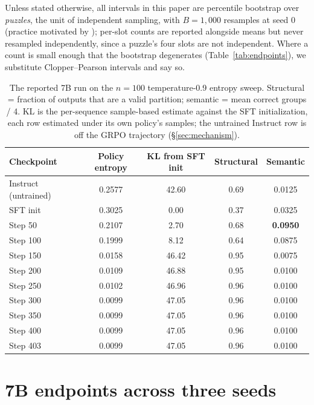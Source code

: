\documentclass{article}
\begin{document}
Unless stated otherwise, all intervals in this paper are percentile bootstrap over \emph{puzzles}, the unit of independent sampling, with $B=1{,}000$ resamples at seed 0 (practice motivated by \citealp{agarwal2021}); per-slot counts are reported alongside
means but never resampled independently, since a puzzle's four slots are
not independent. Where a count is small enough that the bootstrap
degenerates (Table~\ref{tab:endpoints}), we substitute Clopper--Pearson
intervals and say so.

\begin{table}[h]
\centering
\caption{The reported 7B run on the $n=100$ temperature-0.9 entropy sweep.
Structural = fraction of outputs that are a valid partition; semantic = mean
correct groups / 4. KL is the per-sequence sample-based estimate against the
SFT initialization, each row estimated under its own policy's samples; the
untrained Instruct row is off the GRPO trajectory
(\S\ref{sec:mechanism}).}
\label{tab:ckpt}
\begin{tabular}{lcccc}
\toprule
Checkpoint & Policy entropy & KL from SFT init & Structural & Semantic \\
\midrule
Instruct (untrained) & 0.2577 & 42.60 & 0.69 & 0.0125 \\
\midrule
SFT init  & 0.3025 & 0.00  & 0.37 & 0.0325 \\
Step 50   & 0.2107 & 2.70  & 0.68 & \textbf{0.0950} \\
Step 100  & 0.1999 & 8.12  & 0.64 & 0.0875 \\
Step 150  & 0.0158 & 46.42 & 0.95 & 0.0075 \\
Step 200  & 0.0109 & 46.88 & 0.95 & 0.0100 \\
Step 250  & 0.0102 & 46.96 & 0.96 & 0.0100 \\
Step 300  & 0.0099 & 47.05 & 0.96 & 0.0100 \\
Step 350  & 0.0099 & 47.05 & 0.96 & 0.0100 \\
Step 400  & 0.0099 & 47.05 & 0.96 & 0.0100 \\
Step 403  & 0.0099 & 47.05 & 0.96 & 0.0100 \\
\bottomrule
\end{tabular}
\end{table}

\section{7B endpoints across three seeds}
\label{app:endpoints}
\end{document}
